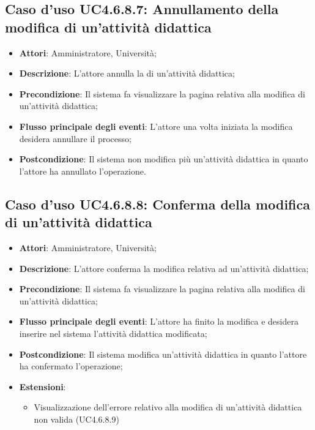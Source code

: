 \subsection{Caso d'uso \texorpdfstring{UC4.6.8.7}{UC4.6.8.7}: Annullamento della modifica di un'attività didattica}
\begin{itemize}
\item \textbf{Attori}: Amministratore, Università;
\item \textbf{Descrizione}: L'attore annulla la di un'attività didattica;

\item \textbf{Precondizione}: Il sistema fa visualizzare la pagina relativa alla modifica di un'attività didattica;

\item \textbf{Flusso principale degli eventi}: L'attore una volta iniziata la modifica desidera annullare il processo;

\item \textbf{Postcondizione}: Il sistema non modifica più un'attività didattica in quanto l'attore ha annullato l'operazione.

\end{itemize}
\subsection{Caso d'uso \texorpdfstring{UC4.6.8.8}{UC4.6.8.8}: Conferma della modifica di un'attività didattica}
\begin{itemize}
\item \textbf{Attori}: Amministratore, Università;
\item \textbf{Descrizione}: L'attore conferma la modifica relativa ad un'attività didattica;

\item \textbf{Precondizione}: Il sistema fa visualizzare la pagina relativa alla modifica di un'attività didattica;


\item \textbf{Flusso principale degli eventi}: L'attore ha finito la modifica e desidera inserire nel sistema l'attività didattica modificata;

\item \textbf{Postcondizione}: Il sistema modifica un'attività didattica in quanto l'attore ha confermato l'operazione;


\item \textbf{Estensioni}:
\begin{itemize}
\item Visualizzazione dell'errore relativo alla modifica di un’attività didattica non valida (UC4.6.8.9)
\end{itemize}
\end{itemize}
